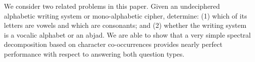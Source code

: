 We consider two related problems in this paper. Given an undeciphered alphabetic writing system or mono-alphabetic cipher, determine: (1) which of its letters are vowels and which are consonants; and (2) whether the writing system is a vocalic alphabet or an abjad.  We are able to show that a very simple spectral decomposition based on character co-occurrences provides nearly perfect performance with respect to answering both question types.
